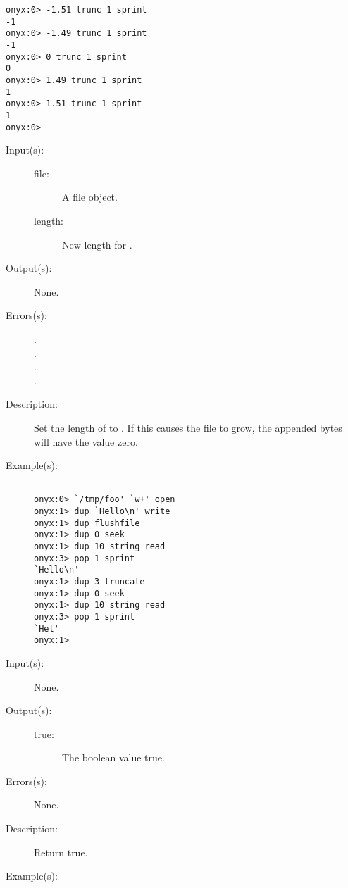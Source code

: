 \begin{description}
\begin{description}
\begin{verbatim}
onyx:0> -1.51 trunc 1 sprint
-1
onyx:0> -1.49 trunc 1 sprint
-1
onyx:0> 0 trunc 1 sprint
0
onyx:0> 1.49 trunc 1 sprint
1
onyx:0> 1.51 trunc 1 sprint
1
onyx:0>
		\end{verbatim}
	\end{description}
\label{systemdict:truncate}
\item[{\onyxop{file length}{truncate}{--}}: ]
	\begin{description}\item[]
	\item[Input(s): ]
		\begin{description}\item[]
		\item[file: ]
			A file object.
		\item[length: ]
			New length for .
		\end{description}
	\item[Output(s): ] None.
	\item[Errors(s): ]
		\begin{description}\item[]
		\item[.]
		\item[.]
		\item[.]
		\item[.]
		\end{description}
	\item[Description: ]
		Set the length of  to .  If this
		causes the file to grow, the appended bytes will have the
		value zero.
	\item[Example(s): ]\begin{verbatim}

onyx:0> `/tmp/foo' `w+' open
onyx:1> dup `Hello\n' write
onyx:1> dup flushfile
onyx:1> dup 0 seek
onyx:1> dup 10 string read
onyx:3> pop 1 sprint
`Hello\n'
onyx:1> dup 3 truncate
onyx:1> dup 0 seek
onyx:1> dup 10 string read
onyx:3> pop 1 sprint
`Hel'
onyx:1>
		\end{verbatim}
	\end{description}
\label{systemdict:true}
\item[{\onyxop{--}{true}{true}}: ]
	\begin{description}\item[]
	\item[Input(s): ] None.
	\item[Output(s): ]
		\begin{description}\item[]
		\item[true: ]
			The boolean value true.
		\end{description}
	\item[Errors(s): ] None.
	\item[Description: ]
		Return true.
	\item[Example(s): ]\begin{verbatim}


\end{verbatim}
\end{description}
\end{description}
